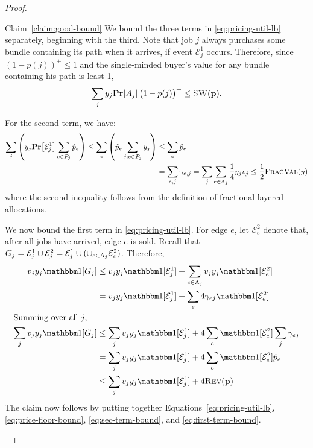 \begin{proof}
\begin{proofof}{Claim~\ref{claim:good-bound}}
  We bound the three terms in \eqref{eq:pricing-util-lb} separately,
  beginning with the third. Note that job $j$ always purchases some
  bundle containing its path when it arrives, if event $\mathcal E^1_j$ occurs. Therefore,
  since $(1 - p(j))^+ \le 1$ and the single-minded buyer's value for
  any bundle containing his path is least 1,
    \begin{equation} 
       \label{eq:price-floor-bound}
        \sum_j y_j\prob{A_j}\big(1 - p(j)\big)^+ \le \sw(\prices).
    \end{equation}

\noindent
    For the second term, we have:
    \begin{align}
      \sum_j \left(y_j \prob{\mathcal E^1_j} \sum_{e\in P_j} \phat_e\right) 
       \le \sum_e \left(\phat_e \sum_{j:e\in P_j} y_j \right) & \le \sum_e \phat_e \nonumber\\
      & = \sum_{e,j} \contrib_{e,j} = \sum_j \sum_{e\in\peakj} \frac
        14 y_jv_j 
      \le \frac 12 \fval(y)
       \label{eq:sec-term-bound}
    \end{align}
    \noindent
    where the second inequality follows from the definition of
    fractional layered allocations.

    We now bound the first term in \eqref{eq:pricing-util-lb}. For
    edge $e$, let $\mathcal E^2_e$ denote that, after all jobs have
    arrived, edge $e$ is sold. Recall that
    $G_j = \mathcal E^1_j \cup \mathcal E^2_j = \mathcal E^1_j \cup
    (\cup_{e\in{\Lambda_{j}}} \mathcal E^2_e) $. Therefore,
    \begin{align}
      v_jy_j\ind[G_j] & \le v_jy_j\ind[\mathcal E^1_j] +
      \sum_{e\in\peakj} v_jy_j\ind[\mathcal E^2_e]\nonumber\\
      & = v_jy_j\ind[\mathcal E^1_j] +
      \sum_{e} 4\contrib_{ej}\ind[\mathcal E^2_e]\nonumber\\
\intertext{Summing over all $j$,}
      \sum_j v_jy_j\ind[G_j] & \le \sum_j  v_jy_j\ind[\mathcal E^1_j]
        + 4\sum_e \ind[\mathcal E^2_e]\sum_j \contrib_{ej}\nonumber\\
      & = \sum_j  v_jy_j\ind[\mathcal E^1_j] + 4 \sum_e 
      \ind[\mathcal E^2_e]\phat_e\nonumber\\
      & \le \sum_j  v_jy_j\ind[\mathcal E^1_j] + 4 \rev(\prices)
\label{eq:first-term-bound}
    \end{align}
    The claim now follows by putting together
    Equations~\eqref{eq:pricing-util-lb},
    \eqref{eq:price-floor-bound}, \eqref{eq:sec-term-bound}, and
    \eqref{eq:first-term-bound}.
\end{proofof}


\end{proof}
